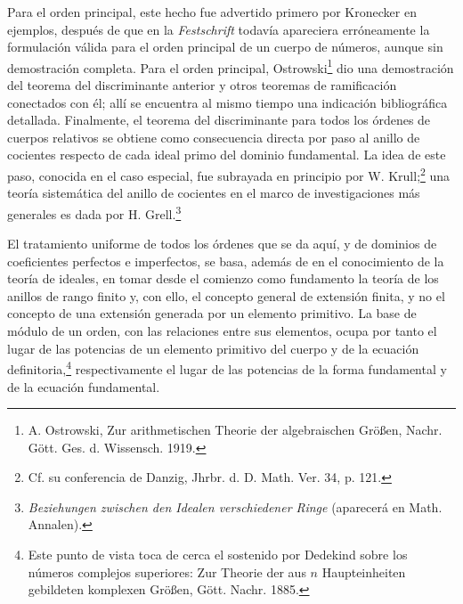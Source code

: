 \documentclass[11pt]{article}
\begin{document}
Para el orden principal, este hecho fue advertido primero por Kronecker en ejemplos, después de que en la \emph{Festschrift} todavía apareciera erróneamente la formulación válida para el orden principal de un cuerpo de números, aunque sin demostración completa. Para el orden principal, Ostrowski\footnote{A. Ostrowski, Zur arithmetischen Theorie der algebraischen Größen, Nachr. Gött. Ges. d. Wissensch. 1919.} dio una demostración del teorema del discriminante anterior y otros teoremas de ramificación conectados con él; allí se encuentra al mismo tiempo una indicación bibliográfica detallada. Finalmente, el teorema del discriminante para todos los órdenes de cuerpos relativos se obtiene como consecuencia directa por paso al anillo de cocientes respecto de cada ideal primo del dominio fundamental. La idea de este paso, conocida en el caso especial, fue subrayada en principio por W. Krull;\footnote{Cf. su conferencia de Danzig, Jhrbr. d. D. Math. Ver. 34, p. 121.} una teoría sistemática del anillo de cocientes en el marco de investigaciones más generales es dada por H. Grell.\footnote{\emph{Beziehungen zwischen den Idealen verschiedener Ringe} (aparecerá en Math. Annalen).}

El tratamiento uniforme de todos los órdenes que se da aquí, y de dominios de coeficientes perfectos e imperfectos, se basa, además de en el conocimiento de la teoría de ideales, en tomar desde el comienzo como fundamento la teoría de los anillos de rango finito y, con ello, el concepto general de extensión finita, y no el concepto de una extensión generada por un elemento primitivo. La base de módulo de un orden, con las relaciones entre sus elementos, ocupa por tanto el lugar de las potencias de un elemento primitivo del cuerpo y de la ecuación definitoria,\footnote{Este punto de vista toca de cerca el sostenido por Dedekind sobre los números complejos superiores: Zur Theorie der aus $n$ Haupteinheiten gebildeten komplexen Größen, Gött. Nachr. 1885.} respectivamente el lugar de las potencias de la forma fundamental y de la ecuación fundamental.
\end{document}
